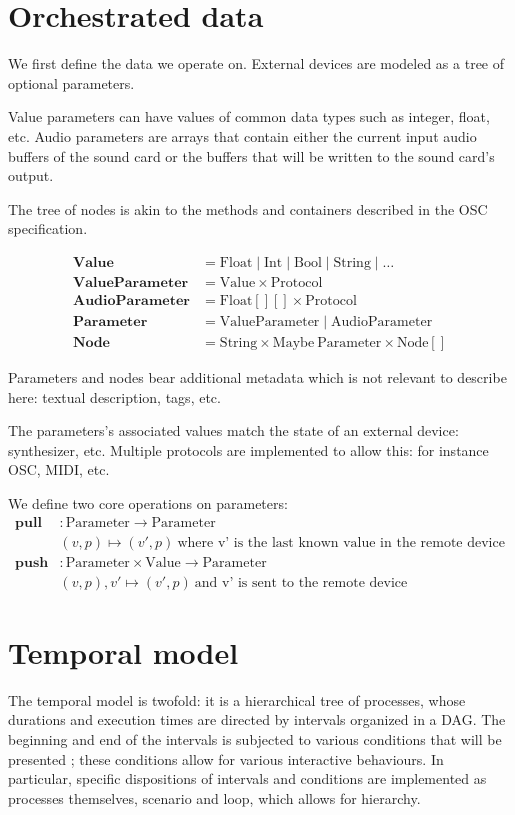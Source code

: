 \documentclass[applsci,article,submit,moreauthors,pdftex,10pt,a4paper]{mdpi}
\begin{document}
\section{Orchestrated data}\label{sec.device}
We first define the data we operate on.
External devices are modeled as a tree of optional parameters.

Value parameters can have values of common data types such as integer, float, etc.
Audio parameters are arrays that contain either the current input audio buffers of the sound card or the buffers that will be written to the sound card's output.

The tree of nodes is akin to the methods and containers described in the OSC specification.

\begin{align*}
\mathbf{Value} & = \mathrm{Float} \mid \mathrm{Int} \mid \mathrm{Bool} \mid \mathrm{String} \mid \dots \\
\mathbf{ValueParameter} & = \mathrm{Value} \times \mathrm{Protocol} \\
\mathbf{AudioParameter} & = \mathrm{Float[][]} \times \mathrm{Protocol} \\
\mathbf{Parameter} & = \mathrm{ValueParameter} \mid \mathrm{AudioParameter} \\
\mathbf{Node} & = \mathrm{String} \times \mathrm{Maybe}~\mathrm{Parameter} \times \mathrm{Node[]} 
\end{align*}

Parameters and nodes bear additional metadata which is not relevant to describe here: textual description, tags, etc.

The parameters's associated values match the state of an external device: synthesizer, etc.
Multiple protocols are implemented to allow this: for instance OSC, MIDI, etc.

We define two core operations on parameters: 
\begin{align*}
\mathbf{pull} & : \mathrm{Parameter} \rightarrow \mathrm{Parameter} \\
              & (v, p) \mapsto (v', p)~\text{where v' is the last known value in the remote device}\\
\mathbf{push} &: \mathrm{Parameter} \times \mathrm{Value} \rightarrow \mathrm{Parameter} \\
              & (v, p), v' \mapsto (v', p)~\text{and v' is sent to the remote device} 
\end{align*}

\section{Temporal model}\label{sec.temporal}
The temporal model is twofold: it is a hierarchical tree of processes, whose durations and execution times are directed by intervals organized in a \ac{DAG}. 
The beginning and end of the intervals is subjected to various conditions that will be presented ; these conditions allow for various 
interactive behaviours. %
In particular, specific dispositions of intervals and conditions are implemented as processes themselves, scenario and loop, which allows for hierarchy.
\end{document}
